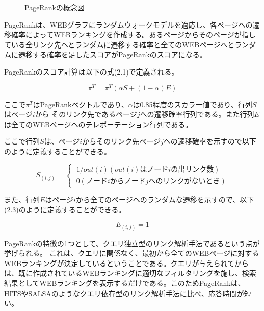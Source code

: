 \documentclass[a4paper,11pt]{jreport}
\begin{document}
\begin{figure}[htbp]
\begin{center}
\end{center}
\caption{PageRankの概念図}
\label{figure:sample}
\end{figure}

PageRankは、WEBグラフにランダムウォークモデルを適応し、各ページヘの遷移確率によってWEBランキングを作成する。あるページからそのページが指している全リンク先へとランダムに遷移する確率と全てのWEBページへとランダムに遷移する確率を足したスコアがPageRankのスコアになる。

PageRankのスコア計算は以下の式(2.1)で定義される。

\begin{equation}
\pi^T = \pi^T(\alpha S + (1 - \alpha)E) 
\end{equation}

ここで$\pi^T$はPageRankベクトルであり、$\alpha$は0.85程度のスカラー値であり、行列$S$はページ$i$から
そのリンク先であるページ$j$への遷移確率行列である。また行列$E$は全てのWEBページヘのテレポーテーション行列である。

ここで行列$S$は、ページ$i$からそのリンク先ページ$j$への遷移確率を示すので以下のように定義することができる。

\begin{equation}
S_{(i,j)} =
\begin{cases}
\; 1/out(i)　(out(i)はノードiの出リンク数) \\
\; 0　(ノードiからノードjへのリンクがないとき)
\end{cases}
\end{equation}

また、行列$E$はページ$i$から全てのページへのランダムな遷移を示すので、以下(2.3)のように定義することができる。

\begin{equation}
E_{(i,j)} = 1
\end{equation}

PageRankの特徴の1つとして、クエリ独立型のリンク解析手法であるという点が挙げられる。
これは、クエリに関係なく、最初から全てのWEBページに対するWEBランキングが決定しているということである。クエリが与えられてからは、既に作成されているWEBランキングに適切なフィルタリングを施し、検索結果としてWEBランキングを表示するだけである。このためPageRankは、HITSやSALSAのようなクエリ依存型のリンク解析手法に比べ、応答時間が短い。
\end{document}
